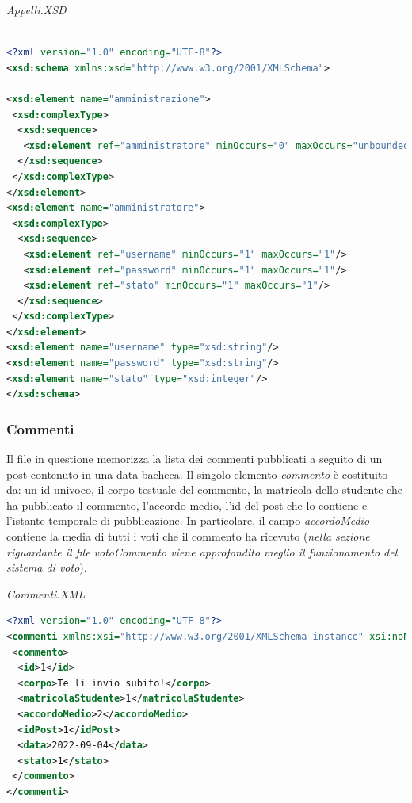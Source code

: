 \documentclass [a4paper,11pt]{book}
\begin{document}
\medskip

\emph{Appelli.XSD}

\begin{lstlisting}[language=XML]

<?xml version="1.0" encoding="UTF-8"?>
<xsd:schema xmlns:xsd="http://www.w3.org/2001/XMLSchema">

<xsd:element name="amministrazione">
 <xsd:complexType>
  <xsd:sequence>
   <xsd:element ref="amministratore" minOccurs="0" maxOccurs="unbounded" />
  </xsd:sequence>
 </xsd:complexType>
</xsd:element>
<xsd:element name="amministratore">
 <xsd:complexType>
  <xsd:sequence>
   <xsd:element ref="username" minOccurs="1" maxOccurs="1"/>
   <xsd:element ref="password" minOccurs="1" maxOccurs="1"/>
   <xsd:element ref="stato" minOccurs="1" maxOccurs="1"/>
  </xsd:sequence>
 </xsd:complexType>
</xsd:element>
<xsd:element name="username" type="xsd:string"/>
<xsd:element name="password" type="xsd:string"/>
<xsd:element name="stato" type="xsd:integer"/>
</xsd:schema>
\end{lstlisting}

\medskip

\subsubsection{Commenti}

Il file in questione memorizza la lista dei commenti pubblicati a seguito di un post contenuto in una data bacheca. Il singolo elemento \emph{commento} è costituito da: un id univoco, il corpo testuale del commento, la matricola dello studente che ha pubblicato il commento, l'accordo medio, l'id del post che lo contiene e l'istante temporale di pubblicazione. In particolare, il campo \emph{accordoMedio} contiene la media di tutti i voti che il commento ha ricevuto (\emph{nella sezione riguardante il file votoCommento viene approfondito meglio il funzionamento del sistema di voto}).

\medskip

\emph{Commenti.XML}

\label{sec:commenti}

\begin{lstlisting}[language=XML]
<?xml version="1.0" encoding="UTF-8"?>
<commenti xmlns:xsi="http://www.w3.org/2001/XMLSchema-instance" xsi:noNamespaceSchemaLocation="commenti.xsd">
 <commento>
  <id>1</id>
  <corpo>Te li invio subito!</corpo>
  <matricolaStudente>1</matricolaStudente>
  <accordoMedio>2</accordoMedio>
  <idPost>1</idPost>
  <data>2022-09-04</data>
  <stato>1</stato>
 </commento>
</commenti>
\end{lstlisting}
\end{document}
